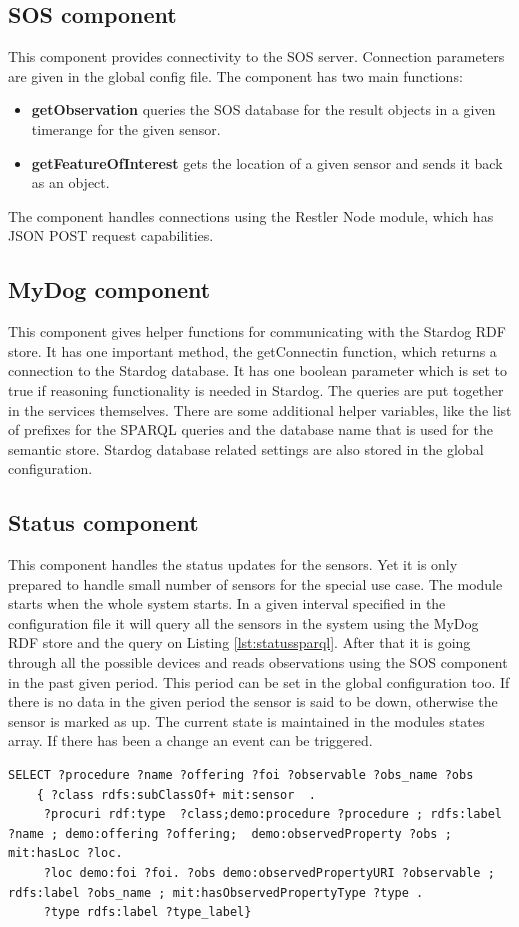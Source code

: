 \subsection{SOS component}
This component provides connectivity to the SOS server. Connection parameters are given in the global config file. The component has two main functions:
\begin{itemize}
\item \textbf{getObservation} queries the SOS database for the result objects in a given timerange for the given sensor.
\item \textbf{getFeatureOfInterest} gets the location of a given sensor and sends it back as an object.
\end{itemize}
The component handles connections using the Restler Node module, which has JSON POST request capabilities.

\subsection{MyDog component}
This component gives helper functions for communicating with the Stardog RDF store. It has one important method, the getConnectin function, which returns a connection to the Stardog database. It has one boolean parameter which is set to true if reasoning functionality is needed in Stardog. The queries are put together in the services themselves. There are some additional helper variables, like the list of prefixes for the SPARQL queries and the database name that is used for the semantic store. Stardog database related settings are also stored in the global configuration.

\subsection{Status component}
This component handles  the status updates for the sensors. Yet it is only prepared to handle small number of sensors for the special use case. The module starts when the whole system starts. 
In a given interval specified in the configuration file it will query all the sensors in the system using the MyDog RDF store and the query on Listing \ref{lst:statussparql}.
After that it is going through all the possible devices and reads observations using the SOS component in the past given period. This period can be set in the global configuration too. 
If there is no data in the given period the sensor is said to be down, otherwise the sensor is marked as up. The current state is maintained in the modules states array. If there has been a change an event can be triggered.
\begin{lstlisting}[caption={SPARQL query for querying all sensors\label{lst:statussparql}}]
SELECT ?procedure ?name ?offering ?foi ?observable ?obs_name ?obs 
    { ?class rdfs:subClassOf+ mit:sensor  .
     ?procuri rdf:type  ?class;demo:procedure ?procedure ; rdfs:label ?name ; demo:offering ?offering;  demo:observedProperty ?obs ; mit:hasLoc ?loc.
     ?loc demo:foi ?foi. ?obs demo:observedPropertyURI ?observable ; rdfs:label ?obs_name ; mit:hasObservedPropertyType ?type .
     ?type rdfs:label ?type_label}
\end{lstlisting}

